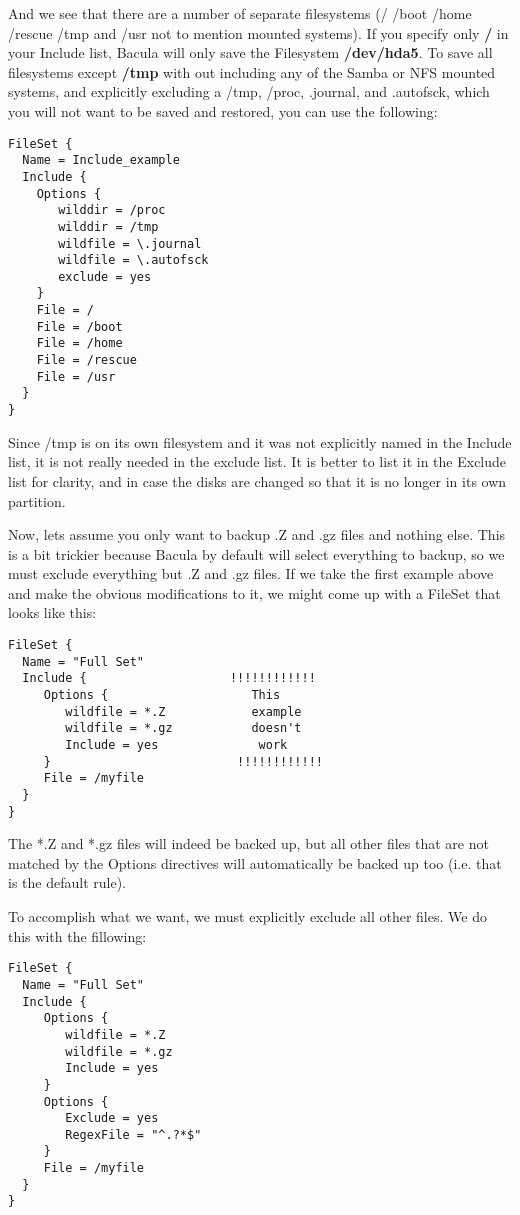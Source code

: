 And we see that there are a number of separate filesystems (/ /boot
/home /rescue /tmp and /usr not to mention mounted systems).
If you specify only {\bf /} in your Include list, Bacula will only save the
Filesystem {\bf /dev/hda5}. To save all filesystems except {\bf /tmp} with
out including any of the Samba or NFS mounted systems, and explicitly
excluding a /tmp, /proc, .journal, and .autofsck, which you will not want to
be saved and restored, you can use the following: 

\footnotesize
\begin{verbatim}
FileSet {
  Name = Include_example
  Include {
    Options {
       wilddir = /proc
       wilddir = /tmp
       wildfile = \.journal
       wildfile = \.autofsck
       exclude = yes
    }
    File = /
    File = /boot
    File = /home
    File = /rescue
    File = /usr
  }
}
\end{verbatim}
\normalsize

Since /tmp is on its own filesystem and it was not explicitly named in the
Include list, it is not really needed in the exclude list. It is better to
list it in the Exclude list for clarity, and in case the disks are changed so
that it is no longer in its own partition. 

Now, lets assume you only want to backup .Z and .gz files and nothing 
else. This is a bit trickier because Bacula by default will select 
everything to backup, so we must exclude everything but .Z and .gz files.
If we take the first example above and make the obvious modifications
to it, we might come up with a FileSet that looks like this:

\footnotesize 
\begin{verbatim}
FileSet {
  Name = "Full Set"
  Include {                    !!!!!!!!!!!!
     Options {                    This
        wildfile = *.Z            example
        wildfile = *.gz           doesn't
        Include = yes              work
     }                          !!!!!!!!!!!!
     File = /myfile
  }
}
\end{verbatim}
\normalsize

The *.Z and *.gz files will indeed be backed up, but all other files
that are not matched by the Options directives will automatically
be backed up too (i.e. that is the default rule).

To accomplish what we want, we must explicitly exclude all other files.
We do this with the fillowing:

\footnotesize
\begin{verbatim}
FileSet {
  Name = "Full Set"
  Include {
     Options {
        wildfile = *.Z
        wildfile = *.gz
        Include = yes
     }
     Options {
        Exclude = yes
        RegexFile = "^.?*$"
     }
     File = /myfile
  }
}
\end{verbatim}
\normalsize

